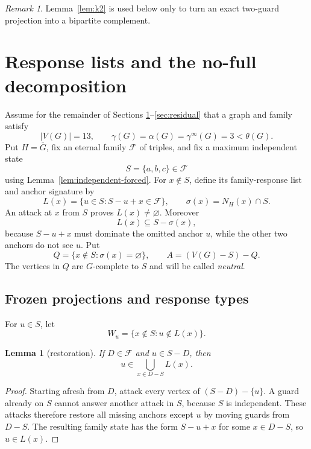 \documentclass[11pt]{article}
\newtheorem{lemma}[theorem]{Lemma}
\theoremstyle{definition}
\theoremstyle{remark}
\newtheorem{remark}[theorem]{Remark}
\newcommand{\gaminf}{\gamma^{\infty}}
\newcommand{\F}{\mathcal F}
\begin{document}
\begin{remark}
Lemma~\ref{lem:k2} is used below only to turn an exact two-guard projection
into a bipartite complement.
\end{remark}

\section{Response lists and the no-full decomposition}\label{sec:response}

Assume for the remainder of Sections \ref{sec:response}--\ref{sec:residual}
that a graph and family satisfy
\[
  |V(G)|=13,\qquad
  \gamma(G)=\alpha(G)=\gaminf(G)=3<\theta(G).
\tag{3.1}
\]
Put \(H=\overline G\), fix an eternal family \(\F\) of triples, and fix a
maximum independent state
\[
  S=\{a,b,c\}\in\F
\tag{3.2}
\]
using Lemma~\ref{lem:independent-forced}.  For \(x\notin S\), define its
family-response list and anchor signature by
\[
  L(x)=\{u\in S:S-u+x\in\F\},
  \qquad
  \sigma(x)=N_H(x)\cap S.
\tag{3.3}
\]
An attack at \(x\) from \(S\) proves \(L(x)\ne\varnothing\).  Moreover
\[
  L(x)\subseteq S-\sigma(x),
\tag{3.4}
\]
because \(S-u+x\) must dominate the omitted anchor \(u\), while the other
two anchors do not see \(u\).  Put
\[
  Q=\{x\notin S:\sigma(x)=\varnothing\},\qquad
  A=(V(G)-S)-Q.
\tag{3.5}
\]
The vertices in \(Q\) are \(G\)-complete to \(S\) and will be called
\emph{neutral}.

\subsection{Frozen projections and response types}

For \(u\in S\), let
\[
  W_u=\{x\notin S:u\notin L(x)\}.
\tag{3.6}
\]

\begin{lemma}[restoration]\label{lem:restoration}
If \(D\in\F\) and \(u\in S-D\), then
\[
  u\in\bigcup_{x\in D-S}L(x).
\tag{3.7}
\]
\end{lemma}

\begin{proof}
Starting afresh from \(D\), attack every vertex of
\((S-D)-\{u\}\).  A guard already on \(S\) cannot answer another attack
in \(S\), because \(S\) is independent.  These attacks therefore restore
all missing anchors except \(u\) by moving guards from \(D-S\).  The
resulting family state has the form \(S-u+x\) for some \(x\in D-S\), so
\(u\in L(x)\).
\end{proof}
\end{document}
